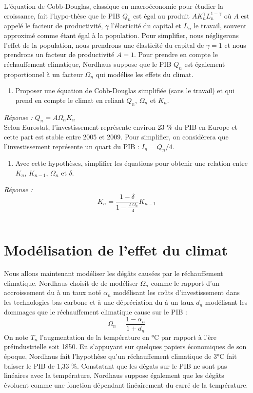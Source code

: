 \documentclass[12pt,a4paper]{article}
\newcommand{\ques}[1]{\begin{enumerate}[resume]
\item  #1
\end{enumerate}}
\newcommand{\rep}[1]{\textit{Réponse :} #1 \\}
\theoremstyle{remark}
\begin{document}
{L'équation de Cobb-Douglas, classique en macroéconomie pour étudier la croissance, fait l'hypo-thèse que le PIB $Q_n$ est égal au produit $AK_n^\gamma L_n^{1-\gamma}$ où $A$ est appelé le facteur de productivité, $\gamma$ l'élasticité du capital et $L_n$ le travail, souvent approximé comme étant égal à la population.
Pour simplifier, nous négligerons l'effet de la population, nous prendrons une élasticité du capital de $\gamma=1$ et nous prendrons un facteur de productivité $A=1$.
Pour prendre en compte le réchauffement climatique, Nordhaus suppose que le PIB $Q_n$ est également proportionnel à un facteur $\Omega_n$ qui modélise les effets du climat. 
\ques{  Proposer une équation de Cobb-Douglas simplifiée (sans le travail) et qui prend en compte le climat en reliant $Q_{n}$, $\Omega_n$ et $K_{n}$.
}
\rep{ $Q_{n}=A \Omega_n K_n$ }
Selon Eurostat, l'investissement représente environ 23 \% du PIB en Europe et cette part est stable entre 2005 et 2009. Pour simplifier, on considèrera que l'investissement représente un quart du PIB : $I_n=Q_n/4$.
\ques{Avec cette hypothèses, simplifier les équations pour obtenir une relation entre $K_n$, $K_{n-1}$, $\Omega_n$ et $\delta$. \label{ques:dynamique_K_1}}
\rep{\begin{equation*} K_n=\frac{1- \delta}{1- \frac{A\Omega_n}{4}} K_{n-1}\end{equation*}}


\section*{\sc Modélisation de l'effet du climat}

Nous allons maintenant modéliser les dégâts causées par le réchauffement climatique. Nordhaus choisit de de modéliser $\Omega_n$ comme le rapport d'un accroissement du à un taux noté $\alpha_n$ modélisant les coûts d'investissement dans les technologies bas carbone et à une dépréciation du à un taux $d_n$ modélisant les dommages que le réchauffement climatique cause sur le PIB :
\begin{equation*}
\Omega_n=\frac{1-\alpha_n}{1+d_n}
\end{equation*}
On note $T_n$ l'augmentation de la température en °C par rapport à l'ère préindustrielle soit 1850.
En s'appuyant sur quelques papiers économiques de son époque, Nordhaus fait l'hypothèse qu'un réchauffement climatique de 3°C fait baisser le PIB de 1,33 \%. 
Constatant que les dégats sur le PIB ne sont pas linéaires avec la température, Nordhaus suppose également que les dégâts évoluent comme une fonction dépendant linéairement du carré de la température.


}
\end{document}
